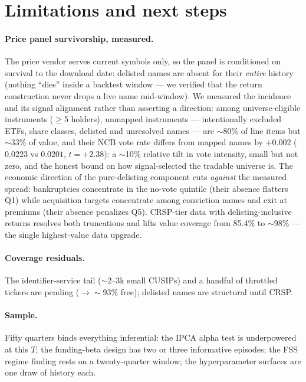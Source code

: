 \section{Limitations and next steps}
\label{sec:limitations}

\paragraph{Price panel survivorship, measured.} The price vendor
serves current symbols only, so the panel is conditioned on survival
to the download date: delisted names are absent for their
\emph{entire} history (nothing ``dies'' inside a backtest window ---
we verified that the return construction never drops a live name
mid-window). We measured the incidence and its signal alignment
rather than asserting a direction: among universe-eligible
instruments ($\ge$5 holders), unmapped instruments --- intentionally
excluded ETFs, share classes, delisted and unresolved names --- are
$\sim$80\% of line items but $\sim$33\% of value, and their NCB vote
rate differs from mapped names by $+0.002$ ($0.0223$ vs $0.0201$,
$t=+2.38$): a $\sim$10\% relative tilt in vote intensity, small but
not zero, and the honest bound on how signal-selected the tradable
universe is. The economic direction of the pure-delisting component
cuts \emph{against} the measured spread: bankruptcies concentrate in
the no-vote quintile (their absence flatters Q1) while acquisition
targets concentrate among conviction names and exit at premiums
(their absence penalizes Q5). CRSP-tier data with
delisting-inclusive returns resolves both truncations and lifts
value coverage from 85.4\% to $\sim$98\% --- the single
highest-value data upgrade.

\paragraph{Coverage residuals.} The identifier-service tail
($\sim$2--3k small CUSIPs) and a handful of throttled tickers are
pending ($\to\sim$93\% free); delisted names are structural until
CRSP.

\paragraph{Sample.} Fifty quarters binds everything inferential: the
IPCA alpha test is underpowered at this $T$; the funding-beta design
has two or three informative episodes; the FSS regime finding rests
on a twenty-quarter window; the hyperparameter surfaces are one draw
of history each.

